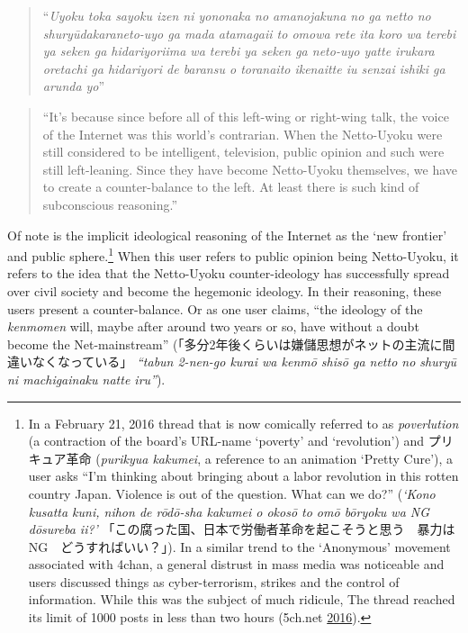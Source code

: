 \documentclass[10pt,british,A4paper,,openany]{memoir}
\begin{document}
\begin{quote}
``\emph{Uyoku toka sayoku izen ni yononaka no amanojakuna no ga netto no
shuryūdakara\newline neto-uyo ga mada atamagaii to omowa rete ita koro
wa terebi ya seken ga hidariyori\newline ima wa terebi ya seken ga
neto-uyo yatte irukara oretachi ga hidariyori de baransu o toranaito
ikenai\newline tte iu senzai ishiki ga arunda yo}''
\end{quote}

\begin{quote}
``It's because since before all of this left-wing or right-wing talk,
the voice of the Internet was this world's contrarian. When the
Netto-Uyoku were still considered to be intelligent, television, public
opinion and such were still left-leaning. Since they have become
Netto-Uyoku themselves, we have to create a counter-balance to the left.
At least there is such kind of subconscious reasoning.''
\end{quote}

Of note is the implicit ideological reasoning of the Internet as the
`new frontier' and public sphere.\footnote{In a February 21, 2016 thread
  that is now comically referred to as \emph{poverlution} (a contraction
  of the board's URL-name `poverty' and `revolution') and プリキュア革命
  (\emph{purikyua kakumei}, a reference to an animation `Pretty Cure'),
  a user asks ``I'm thinking about bringing about a labor revolution in
  this rotten country Japan. Violence is out of the question. What can
  we do?'' (\emph{`Kono kusatta kuni, nihon de rōdō-sha kakumei o okosō
  to omō bōryoku wa NG dōsureba ii?'}
  「この腐った国、日本で労働者革命を起こそうと思う　暴力はNG　どうすればいい？」).
  In a similar trend to the `Anonymous' movement associated with 4chan,
  a general distrust in mass media was noticeable and users discussed
  things as cyber-terrorism, strikes and the control of information.
  While this was the subject of much ridicule, The thread reached its
  limit of 1000 posts in less than two hours (5ch.net
  \protect\hyperlink{ref-5ch.net_eng._2016}{2016}).} When this user
refers to public opinion being Netto-Uyoku, it refers to the idea that
the Netto-Uyoku counter-ideology has successfully spread over civil
society and become the hegemonic ideology. In their reasoning, these
users present a counter-balance. Or as one user claims, ``the ideology
of the \emph{kenmomen} will, maybe after around two years or so, have
without a doubt become the Net-mainstream''
(「多分2年後くらいは嫌儲思想がネットの主流に間違いなくなっている」
\emph{``tabun 2-nen-go kurai wa kenmō shisō ga netto no shuryū ni
machigainaku natte iru''}).
\end{document}
